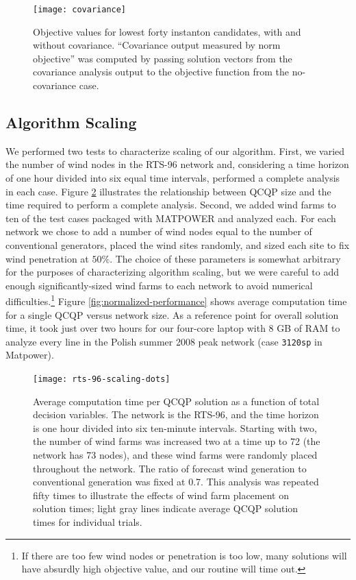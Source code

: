 \documentclass[journal,twoside]{IEEEtran}
\begin{document}
\begin{figure}
\centering
\texttt{[image: covariance]}
\caption{Objective values for lowest forty instanton candidates, with and without covariance. ``Covariance output measured by norm objective'' was computed by passing solution vectors from the covariance analysis output to the objective function from the no-covariance case.}
\label{fig:covariance}
\end{figure}

\subsection{Algorithm Scaling}
We performed two tests to characterize scaling of our algorithm. First, we varied the number of wind nodes in the RTS-96 network and, considering a time horizon of one hour divided into six equal time intervals, performed a complete analysis in each case. Figure \ref{fig:rts-96-scaling} illustrates the relationship between QCQP size and the time required to perform a complete analysis. Second, we added wind farms to ten of the test cases packaged with MATPOWER \cite{zimmerman2011} and analyzed each. For each network we chose to add a number of wind nodes equal to the number of conventional generators, placed the wind sites randomly, and sized each site to fix wind penetration at $50\%$. The choice of these parameters is somewhat arbitrary for the purposes of characterizing algorithm scaling, but we were careful to add enough significantly-sized wind farms to each network to avoid numerical difficulties.\footnote{If there are too few wind nodes or penetration is too low, many solutions will have absurdly high objective value, and our routine will time out.} Figure \ref{fig:normalized-performance} shows average computation time for a single QCQP versus network size. As a reference point for overall solution time, it took just over two hours for our four-core laptop with 8 GB of RAM to analyze every line in the Polish summer 2008 peak network (case \texttt{3120sp} in Matpower).

\begin{figure}
\centering
\texttt{[image: rts-96-scaling-dots]}
\caption{Average computation time per QCQP solution as a function of total decision variables. The network is the RTS-96, and the time horizon is one hour divided into six ten-minute intervals. Starting with two, the number of wind farms was increased two at a time up to 72 (the network has 73 nodes), and these wind farms were randomly placed throughout the network. The ratio of forecast wind generation to conventional generation was fixed at 0.7. This analysis was repeated fifty times to illustrate the effects of wind farm placement on solution times; light gray lines indicate average QCQP solution times for individual trials.}
\label{fig:rts-96-scaling}
\end{figure}
\end{document}

